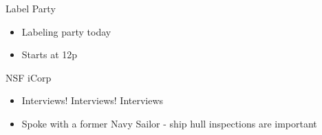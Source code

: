 \begin{frame}{Label Party}
    \begin{itemize}
        \item Labeling party today
        \item Starts at 12p
    \end{itemize}
\end{frame}

\begin{frame}{NSF iCorp}
    \begin{itemize}
        \item Interviews! Interviews! Interviews
        \item Spoke with a former Navy Sailor - ship hull inspections are important
    \end{itemize}
\end{frame}






